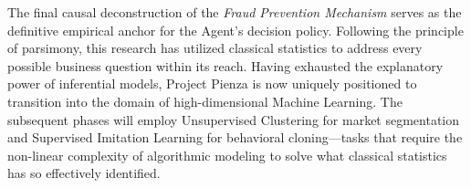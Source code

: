 The final causal deconstruction of the \textit{Fraud Prevention Mechanism} serves as the definitive empirical anchor for the Agent’s decision policy. Following the principle of parsimony, this research has utilized classical statistics to address every possible business question within its reach. Having exhausted the explanatory power of inferential models, Project Pienza is now uniquely positioned to transition into the domain of high-dimensional Machine Learning. The subsequent phases will employ Unsupervised Clustering for market segmentation and Supervised Imitation Learning for behavioral cloning—tasks that require the non-linear complexity of algorithmic modeling to solve what classical statistics has so effectively identified.